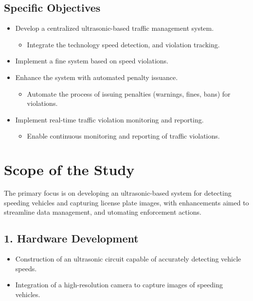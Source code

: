 \subsection{Specific Objectives}
\begin{itemize}
  \item Develop a centralized ultrasonic-based traffic management system.
  \begin{itemize}
    \item Integrate the technology speed detection, and violation tracking.
  \end{itemize}
  
  \item Implement a fine system based on speed violations.
  
  \item Enhance the system with automated penalty issuance.
  \begin{itemize}
    \item Automate the process of issuing penalties (warnings, fines, bans) for violations.
  \end{itemize}
  
  \item Implement real-time traffic violation monitoring and reporting.
  \begin{itemize}
    \item Enable continuous monitoring and reporting of traffic violations.
  \end{itemize}
\end{itemize}

\section{Scope of the Study}
The primary focus is on developing an ultrasonic-based system for detecting speeding vehicles and capturing license plate images, with enhancements aimed to streamline data management, and utomating enforcement actions.

\subsection*{1. Hardware Development}
\begin{itemize}
  \item Construction of an ultrasonic circuit capable of accurately detecting vehicle speeds.
  \item Integration of a high-resolution camera to capture images of speeding vehicles.
\end{itemize}

